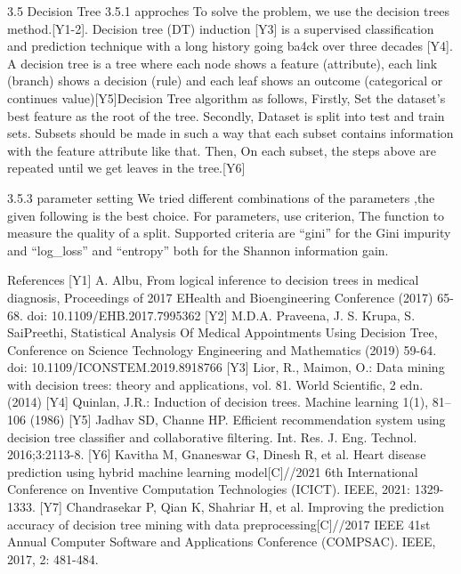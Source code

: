 3.5 Decision Tree
3.5.1 approches
To solve the problem, we use the decision trees method.[Y1-2]. Decision tree (DT) induction [Y3] is a supervised classification and prediction technique with a long history going ba4ck over three decades [Y4]. A decision tree is a tree where each node shows a feature (attribute), each link (branch) shows a decision (rule) and each leaf shows an outcome (categorical or continues value)[Y5]Decision Tree algorithm as follows, Firstly, Set the dataset's best feature as the root of the tree. Secondly, Dataset is split into test and train sets. Subsets should be made in such a way that each subset contains information with the feature attribute like that. Then, On each subset, the steps above are repeated until we get leaves in the tree.[Y6]





3.5.3 parameter setting
We tried different combinations of the parameters ,the given following is the best choice. For parameters, use criterion, The function to measure the quality of a split. Supported criteria are “gini” for the Gini impurity and “log\_loss” and “entropy” both for the Shannon information gain.





References
[Y1] A. Albu, From logical inference to decision trees in medical diagnosis, Proceedings of 2017 EHealth and Bioengineering Conference (2017) 65-68. doi: 10.1109/EHB.2017.7995362 
[Y2] M.D.A. Praveena, J. S. Krupa, S. SaiPreethi, Statistical Analysis Of Medical Appointments Using Decision Tree, Conference on Science Technology Engineering and Mathematics (2019) 59-64. doi: 10.1109/ICONSTEM.2019.8918766
[Y3] Lior, R., Maimon, O.: Data mining with decision trees: theory and applications, vol. 81. World Scientific, 2 edn. (2014)
[Y4] Quinlan, J.R.: Induction of decision trees. Machine learning 1(1), 81–106 (1986)
[Y5] Jadhav SD, Channe HP. Efficient recommendation system using decision tree classifier and collaborative filtering. Int. Res. J. Eng. Technol. 2016;3:2113-8.
[Y6] Kavitha M, Gnaneswar G, Dinesh R, et al. Heart disease prediction using hybrid machine learning model[C]//2021 6th International Conference on Inventive Computation Technologies (ICICT). IEEE, 2021: 1329-1333.
[Y7] Chandrasekar P, Qian K, Shahriar H, et al. Improving the prediction accuracy of decision tree mining with data preprocessing[C]//2017 IEEE 41st Annual Computer Software and Applications Conference (COMPSAC). IEEE, 2017, 2: 481-484.
